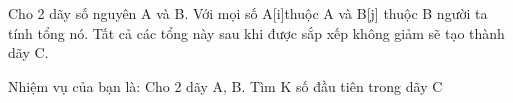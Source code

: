 Cho 2 dãy số nguyên A và B. Với mọi số A[i]thuộc A và B[j] thuộc B người ta tính tổng nó. Tất cả các tổng này sau khi được sắp xếp không giảm sẽ tạo thành dãy C.  

   Nhiệm vụ của bạn là: Cho 2 dãy A, B. Tìm K số đầu tiên trong dãy C